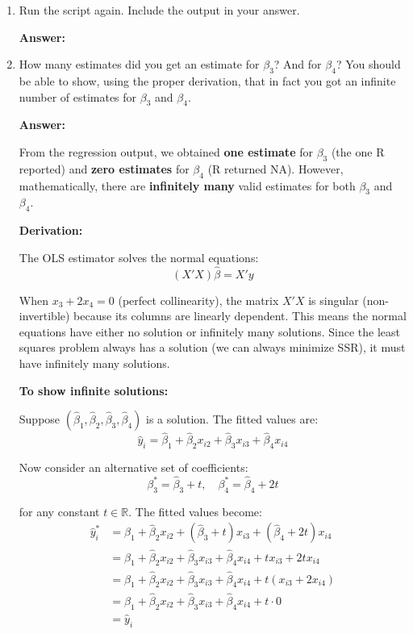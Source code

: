 \documentclass[12pt,a4paper]{article}
\begin{document}
\begin{enumerate}[label=(\roman*)]
  \item Run the script again. Include the output in your answer.
  
  \textbf{Answer:} 

 
  
  \item How many estimates did you get an estimate for $\beta_3$? And for $\beta_4$? You should be able to show, using the proper derivation, that in fact you got an infinite number of estimates for $\beta_3$ and $\beta_4$.
  
  \textbf{Answer:} 

  From the regression output, we obtained \textbf{one estimate} for $\beta_3$ (the one R reported) and \textbf{zero estimates} for $\beta_4$ (R returned NA). 
  However, mathematically, there are \textbf{infinitely many} valid estimates for both $\beta_3$ and $\beta_4$.

  \textbf{Derivation:}

      The OLS estimator solves the normal equations:
      $$(X'X)\hat{\beta} = X'y$$

    When $x_3 + 2x_4 = 0$ (perfect collinearity), the matrix $X'X$ is singular (non-invertible) because 
    its columns are linearly dependent. This means the normal equations have either no solution or infinitely many solutions. 
    Since the least squares problem always has a solution (we can always minimize SSR), it must have infinitely many solutions.

  \textbf{To show infinite solutions:}

  Suppose $(\hat{\beta}_1, \hat{\beta}_2, \hat{\beta}_3, \hat{\beta}_4)$ is a solution. 
  The fitted values are:
  $$\hat{y}_i = \hat{\beta}_1 + \hat{\beta}_2 x_{i2} + \hat{\beta}_3 x_{i3} + \hat{\beta}_4 x_{i4}$$

  Now consider an alternative set of coefficients:
  $$\beta_3^* = \hat{\beta}_3 + t, \quad \beta_4^* = \hat{\beta}_4 + 2t$$

  for any constant $t \in \mathbb{R}$. The fitted values become:
  \begin{align*}
    \hat{y}_i^* &= \hat{\beta}_1 + \hat{\beta}_2 x_{i2} + (\hat{\beta}_3 + t) x_{i3} + (\hat{\beta}_4 + 2t) x_{i4} \\
    &= \hat{\beta}_1 + \hat{\beta}_2 x_{i2} + \hat{\beta}_3 x_{i3} + \hat{\beta}_4 x_{i4} + t x_{i3} + 2t x_{i4} \\
    &= \hat{\beta}_1 + \hat{\beta}_2 x_{i2} + \hat{\beta}_3 x_{i3} + \hat{\beta}_4 x_{i4} + t(x_{i3} + 2x_{i4}) \\
    &= \hat{\beta}_1 + \hat{\beta}_2 x_{i2} + \hat{\beta}_3 x_{i3} + \hat{\beta}_4 x_{i4} + t \cdot 0 \\
    &= \hat{y}_i
  \end{align*}


\end{enumerate}
\end{document}
